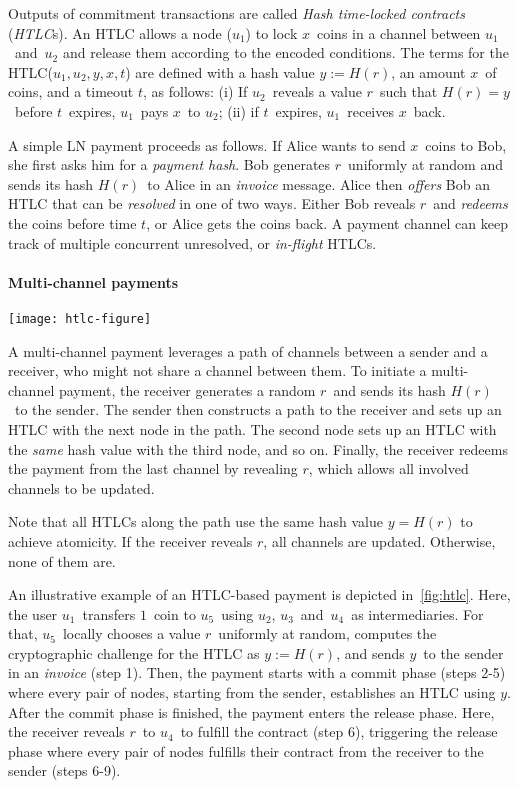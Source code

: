 Outputs of commitment transactions are called \textit{Hash time-locked contracts} (\textit{HTLC}s).
An HTLC allows a node ($u_1$) to lock $x$~coins in a channel between $u_1$~and~$u_2$ and release them according to the encoded conditions.
The terms for the HTLC($u_1, u_2, y, x, t$) are defined with a hash value $y := H(r)$, an amount $x$~of coins, and a timeout $t$, as follows: 
(i) If $u_2$~reveals a value $r$~such that $H(r) = y$~before $t$~expires, $u_1$~pays $x$~to $u_2$; 
(ii) if $t$~expires, $u_1$~receives $x$~back.

A simple LN payment proceeds as follows.
If Alice wants to send $x$~coins to Bob, she first asks him for a \textit{payment hash}.
Bob generates $r$~uniformly at random and sends its hash $H(r)$~to Alice in an \textit{invoice} message.
Alice then \textit{offers} Bob an HTLC that can be \textit{resolved} in one of two ways.
Either Bob reveals $r$~and \textit{redeems} the coins before time $t$, or Alice gets the coins back.
A payment channel can keep track of multiple concurrent unresolved, or \textit{in-flight} HTLCs.


\paragraph{Multi-channel payments}

\begin{figure*}
	\texttt{[image: htlc-figure]}
	\caption{An HTLC-based payment in the Lightning Network.}
	\label{fig:htlc}
\end{figure*}

A multi-channel payment leverages a path of channels between a sender and a receiver, who might not share a channel between them.
To initiate a multi-channel payment, the receiver generates a random $r$~and sends its hash $H(r)$~to the sender.
The sender then constructs a path to the receiver and sets up an HTLC with the next node in the path.
The second node sets up an HTLC with the \textit{same} hash value with the third node, and so on.
Finally, the receiver redeems the payment from the last channel by revealing $r$, which allows all involved channels to be updated.

Note that all HTLCs along the path use the same hash value $y=H(r)$ to achieve atomicity.
If the receiver reveals $r$, all channels are updated.
Otherwise, none of them are.

An illustrative example of an HTLC-based payment is depicted in~\cref{fig:htlc}.
Here, the user $u_1$~transfers $1$~coin to $u_5$~using $u_2$, $u_3$~and~$u_4$~as intermediaries.
For that, $u_5$~locally chooses a value $r$~uniformly at random, computes the cryptographic challenge for the HTLC as $y := H(r)$, and sends $y$~to the sender in an \textit{invoice} (step 1).
Then, the payment starts with a commit phase (steps 2-5) where every pair of nodes, starting from the sender, establishes an HTLC using $y$.
After the commit phase is finished, the payment enters the release phase.
Here, the receiver reveals $r$~to $u_4$~to fulfill the contract (step 6), triggering the release phase where every pair of nodes fulfills their contract from the receiver to the sender (steps 6-9).

